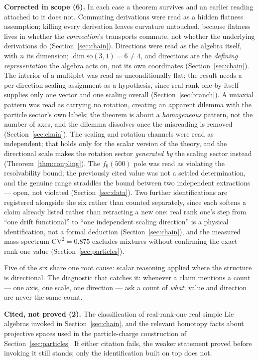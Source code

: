 \documentclass[aps,prd,twocolumn,superscriptaddress,nofootinbib]{revtex4-2}
\begin{document}
\textbf{Corrected in scope (6).} In each case a theorem survives and an
earlier reading attached to it does not. Commuting derivations were read
as a hidden flatness assumption; killing every derivation leaves
curvature untouched, because flatness lives in whether the
\emph{connection}'s transports commute, not whether the underlying
derivations do (Section~\ref{sec:chain}). Directions were read as the
algebra itself, with $n$ its dimension; $\dim\mathrm{so}(3,1)=6\neq4$,
and directions are the \emph{defining representation} the algebra acts
on, not its own coordinates (Section~\ref{sec:chain}). The interior of a
multiplet was read as unconditionally flat; the result needs a
per-direction scaling assignment as a hypothesis, since real rank one by
itself supplies only one vector and one scaling overall
(Section~\ref{sec:branch}). A uniaxial pattern was read as carrying no
rotation, creating an apparent dilemma with the particle sector's own
labels; the theorem is about a \emph{homogeneous} pattern, not the
number of axes, and the dilemma dissolves once the misreading is removed
(Section~\ref{sec:chain}). The scaling and rotation channels were read as
independent; that holds only for the scalar version of the theory, and
the directional scale makes the rotation sector \emph{generated by} the
scaling sector instead (Theorem~\ref{thm:coupling}). The $f_0(500)$ pole
was read as violating the resolvability bound; the previously cited
value was not a settled determination, and the genuine range straddles
the bound between two independent extractions — open, not violated
(Section~\ref{sec:data}). Two further identifications are registered
alongside the six rather than counted separately, since each softens a
claim already listed rather than retracting a new one: real rank one's
step from ``one drift functional'' to ``one independent scaling
direction'' is a physical identification, not a formal deduction
(Section~\ref{sec:chain}), and the measured mass-spectrum $\mathrm{CV}^2=0.875$
excludes mixtures without confirming the exact rank-one value
(Section~\ref{sec:particles}).

Five of the six share one root cause: scalar reasoning applied where the
structure is directional. The diagnostic that catches it: whenever a
claim mentions a count — one axis, one scale, one direction — ask a
count of \emph{what}; value and direction are never the same count.

\textbf{Cited, not proved (2).} The classification of real-rank-one real
simple Lie algebras invoked in Section~\ref{sec:chain}, and the relevant
homotopy facts about projective spaces used in the particle-charge
construction of Section~\ref{sec:particles}. If either citation fails,
the weaker statement proved before invoking it still stands; only the
identification built on top does not.
\end{document}
